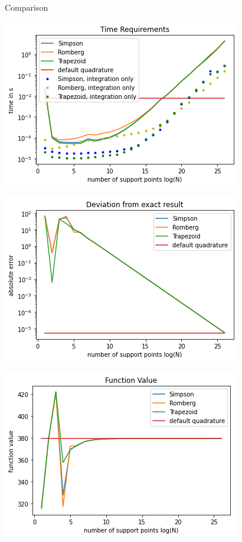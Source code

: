 
\begin{frame}{Comparison}
%
\begin{minipage}{.3\linewidth}
	\includegraphics[width=\linewidth]{./gfx/sciPy-int-time}
\end{minipage}
\phantom{x}
\begin{minipage}{.3\linewidth}
	\includegraphics[width=\linewidth]{./gfx/sciPy-int-error}
\end{minipage}
\phantom{x}
\begin{minipage}{.3\linewidth}
	\includegraphics[width=\linewidth]{./gfx/sciPy-int-value}

\end{minipage}
\end{frame}

